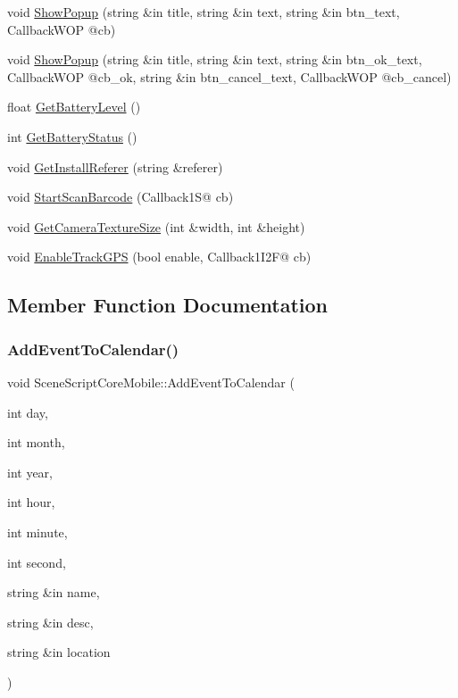 \begin{DoxyCompactItemize}
\item 
void \hyperlink{class_scene_script_core_mobile_a62cb4343a032f015a7d5adaa4a0a9782}{Show\+Popup} (string \&in title, string \&in text, string \&in btn\+\_\+text, Callback\+W\+OP @cb)
\item 
void \hyperlink{class_scene_script_core_mobile_a00b413238b2760487a2b15bc6523214e}{Show\+Popup} (string \&in title, string \&in text, string \&in btn\+\_\+ok\+\_\+text, Callback\+W\+OP @cb\+\_\+ok, string \&in btn\+\_\+cancel\+\_\+text, Callback\+W\+OP @cb\+\_\+cancel)
\item 
float \hyperlink{class_scene_script_core_mobile_ae5998ea117850e790822c3446834e15f}{Get\+Battery\+Level} ()
\item 
int \hyperlink{class_scene_script_core_mobile_a34e0107e67f704de98e425673e189a5c}{Get\+Battery\+Status} ()
\item 
void \hyperlink{class_scene_script_core_mobile_a2cf129468a46d881c92acdb357cbf662}{Get\+Install\+Referer} (string \&referer)
\item 
void \hyperlink{class_scene_script_core_mobile_a50227898d842f9fe68574d9512b4f3ae}{Start\+Scan\+Barcode} (Callback1S@ cb)
\item 
void \hyperlink{class_scene_script_core_mobile_a7e4ce77ca8cf3d103a27209e7f92bc88}{Get\+Camera\+Texture\+Size} (int \&width, int \&height)
\item 
void \hyperlink{class_scene_script_core_mobile_a099ef38d65b95396210b8e62089f2a91}{Enable\+Track\+G\+PS} (bool enable, Callback1\+I2F@ cb)
\end{DoxyCompactItemize}


\subsection{Member Function Documentation}
\hypertarget{class_scene_script_core_mobile_a0fa7d779e73b1d58218846266739c487}{}\label{class_scene_script_core_mobile_a0fa7d779e73b1d58218846266739c487} 
\subsubsection{\texorpdfstring{Add\+Event\+To\+Calendar()}{AddEventToCalendar()}}
{\footnotesize\ttfamily void Scene\+Script\+Core\+Mobile\+::\+Add\+Event\+To\+Calendar (\begin{DoxyParamCaption}\item[{int}]{day,  }\item[{int}]{month,  }\item[{int}]{year,  }\item[{int}]{hour,  }\item[{int}]{minute,  }\item[{int}]{second,  }\item[{string \&in}]{name,  }\item[{string \&in}]{desc,  }\item[{string \&in}]{location }\end{DoxyParamCaption})}

